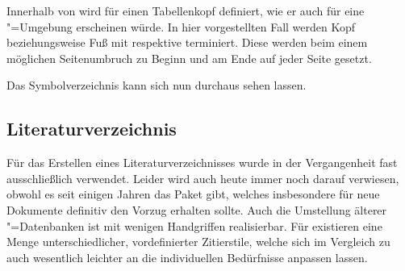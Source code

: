 \documentclass[%
  english,ngerman,%
  cdgeometry=no,DIV=12,automark,%
]{tudscrartcl}
\begin{document}
%
\CodeHook{\let\newglossarystyle\renewglossarystyle}
\begin{Preamble*}
\end{Preamble*}
%
Innerhalb von  wird  für einen
Tabellenkopf definiert, wie er auch für eine "=Umgebung 
erscheinen würde. In hier vorgestellten Fall werden Kopf beziehungsweise Fuß 
mit  respektive  terminiert. Diese werden beim 
einem möglichen Seitenumbruch zu Beginn und am Ende auf jeder Seite gesetzt.
%
\begin{Preamble+}
}%

\end{Preamble+}
%
Das Symbolverzeichnis kann sich nun durchaus sehen lassen.
%
\begin{Hint}
\printsymbols[style=symblongtabu]
\end{Hint}
\begin{quoting}[rightmargin=0pt]
\printsymbols[style=symbtabu]
\end{quoting}


\subsection{Literaturverzeichnis}
\label{sec:biblatex}
Für das Erstellen eines Literaturverzeichnisses wurde in der Vergangenheit fast 
ausschließlich  verwendet. Leider wird auch heute immer noch 
darauf verwiesen, obwohl es seit einigen Jahren das Paket  
gibt, welches insbesondere für neue Dokumente definitiv den Vorzug erhalten 
sollte. Auch die Umstellung älterer "=Datenbanken ist mit 
wenigen Handgriffen realisierbar. Für  existieren eine Menge 
unterschiedlicher, vordefinierter Zitierstile, welche sich im Vergleich zu 
 auch wesentlich leichter an die individuellen Bedürfnisse 
anpassen lassen.
\end{document}
